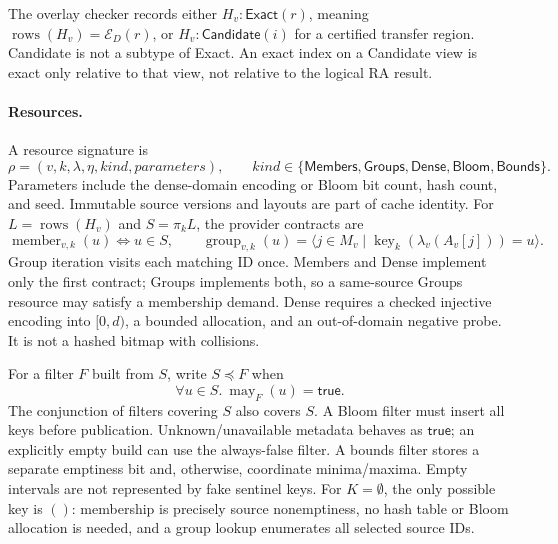 The overlay checker records either $H_v:\mathsf{Exact}(r)$, meaning
$\operatorname{rows}(H_v)=\mathcal E_D(r)$, or
$H_v:\mathsf{Candidate}(i)$ for a certified transfer region. Candidate is
not a subtype of Exact. An exact index on a Candidate view is exact only
relative to that view, not relative to the logical RA result.

\paragraph{Resources.}
A resource signature is
\[
 \rho=(v,k,\lambda,\eta,\mathit{kind},\mathit{parameters}),\qquad
 \mathit{kind}\in\{\mathsf{Members},\mathsf{Groups},\mathsf{Dense},
                    \mathsf{Bloom},\mathsf{Bounds}\}.
\]
Parameters include the dense-domain encoding or Bloom bit count, hash count,
and seed. Immutable source versions and layouts are part of cache identity.
For $L=\operatorname{rows}(H_v)$ and $S=\pi_k L$, the provider contracts are
\[
 \operatorname{member}_{v,k}(u)\iff u\in S,\qquad
 \operatorname{group}_{v,k}(u)
   =\langle j\in M_v\mid\operatorname{key}_k(\lambda_v(A_v[j]))=u\rangle.
\]
Group iteration visits each matching ID once. Members and Dense implement
only the first contract; Groups implements both, so a same-source Groups
resource may satisfy a membership demand. Dense requires a checked injective
encoding into $[0,d)$, a bounded allocation, and an out-of-domain negative
probe. It is not a hashed bitmap with collisions.

For a filter $F$ built from $S$, write $S\preceq F$ when
\[
 \forall u\in S.\ \operatorname{may}_F(u)=\mathsf{true}.
\]
The conjunction of filters covering $S$ also covers $S$. A Bloom filter must
insert all keys before publication. Unknown/unavailable metadata behaves as
$\mathsf{true}$; an explicitly empty build can use the always-false filter.
A bounds filter stores a separate emptiness bit and, otherwise, coordinate
minima/maxima. Empty intervals are not represented by fake sentinel keys.
For $K=\emptyset$, the only possible key is $()$: membership is precisely
source nonemptiness, no hash table or Bloom allocation is needed, and a group
lookup enumerates all selected source IDs.

